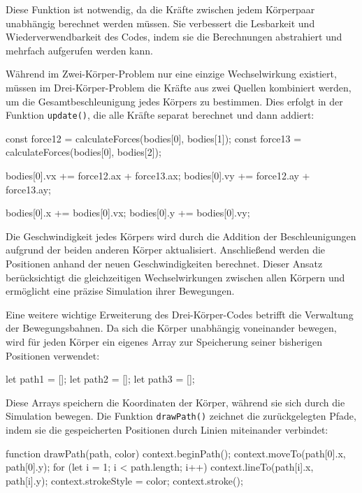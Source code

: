 \documentclass[a4paper,12pt,twoside]{article}
\begin{document}
Diese Funktion ist notwendig, da die Kräfte zwischen jedem Körperpaar unabhängig berechnet werden müssen. Sie verbessert die Lesbarkeit und Wiederverwendbarkeit des Codes, indem sie die Berechnungen abstrahiert und mehrfach aufgerufen werden kann.

Während im Zwei-Körper-Problem nur eine einzige Wechselwirkung existiert, müssen im Drei-Körper-Problem die Kräfte aus zwei Quellen kombiniert werden, um die Gesamtbeschleunigung jedes Körpers zu bestimmen. Dies erfolgt in der Funktion \texttt{update()}, die alle Kräfte separat berechnet und dann addiert:

\begin{javascript}
const force12 = calculateForces(bodies[0], bodies[1]);
const force13 = calculateForces(bodies[0], bodies[2]);

bodies[0].vx += force12.ax + force13.ax;
bodies[0].vy += force12.ay + force13.ay;

bodies[0].x += bodies[0].vx;
bodies[0].y += bodies[0].vy;
\end{javascript}

Die Geschwindigkeit jedes Körpers wird durch die Addition der Beschleunigungen aufgrund der beiden anderen Körper aktualisiert. Anschließend werden die Positionen anhand der neuen Geschwindigkeiten berechnet. Dieser Ansatz berücksichtigt die gleichzeitigen Wechselwirkungen zwischen allen Körpern und ermöglicht eine präzise Simulation ihrer Bewegungen.

Eine weitere wichtige Erweiterung des Drei-Körper-Codes betrifft die Verwaltung der Bewegungsbahnen. Da sich die Körper unabhängig voneinander bewegen, wird für jeden Körper ein eigenes Array zur Speicherung seiner bisherigen Positionen verwendet:

\begin{javascript}
let path1 = [];
let path2 = [];
let path3 = [];
\end{javascript}

Diese Arrays speichern die Koordinaten der Körper, während sie sich durch die Simulation bewegen. Die Funktion \texttt{drawPath()} zeichnet die zurückgelegten Pfade, indem sie die gespeicherten Positionen durch Linien miteinander verbindet:

\begin{javascript}
function drawPath(path, color) {
    context.beginPath();
    context.moveTo(path[0].x, path[0].y);
    for (let i = 1; i < path.length; i++) {
        context.lineTo(path[i].x, path[i].y);
    }
    context.strokeStyle = color;
    context.stroke();
}
\end{javascript}
\end{document}
